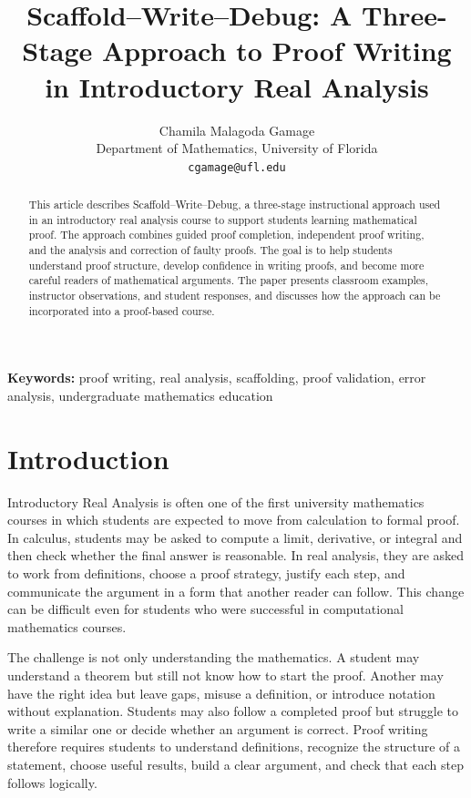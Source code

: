 \documentclass[12pt]{article}
\title{Scaffold--Write--Debug: A Three-Stage Approach to Proof Writing in Introductory Real Analysis}
\author{Chamila Malagoda Gamage\\
Department of Mathematics, University of Florida\\
\texttt{cgamage@ufl.edu}}
\date{}
\begin{document}
\maketitle

\begin{abstract}
This article describes Scaffold--Write--Debug, a three-stage instructional approach used in an introductory real analysis course to support students learning mathematical proof. The approach combines guided proof completion, independent proof writing, and the analysis and correction of faulty proofs. The goal is to help students understand proof structure, develop confidence in writing proofs, and become more careful readers of mathematical arguments. The paper presents classroom examples, instructor observations, and student responses, and discusses how the approach can be incorporated into a proof-based course.
\end{abstract}

\noindent\textbf{Keywords:} proof writing, real analysis, scaffolding, proof validation, error analysis, undergraduate mathematics education

\section{Introduction}

Introductory Real Analysis is often one of the first university mathematics courses in which students are expected to move from calculation to formal proof. In calculus, students may be asked to compute a limit, derivative, or integral and then check whether the final answer is reasonable. In real analysis, they are asked to work from definitions, choose a proof strategy, justify each step, and communicate the argument in a form that another reader can follow. This change can be difficult even for students who were successful in computational mathematics courses.

The challenge is not only understanding the mathematics. A student may understand a theorem but still not know how to start the proof. Another may have the right idea but leave gaps, misuse a definition, or introduce notation without explanation. Students may also follow a completed proof but struggle to write a similar one or decide whether an argument is correct. Proof writing therefore requires students to understand definitions, recognize the structure of a statement, choose useful results, build a clear argument, and check that each step follows logically.
\end{document}
